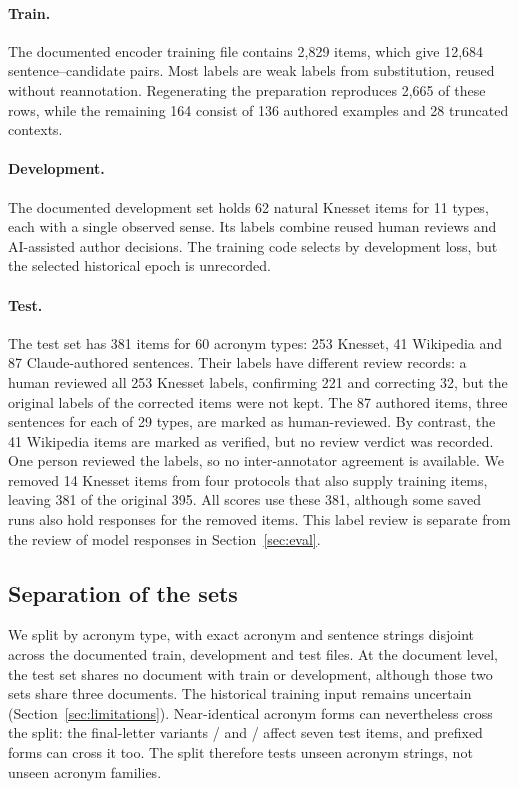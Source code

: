 \paragraph{Train.} The documented encoder training file contains 2,829 items, which give 12,684 sentence--candidate pairs. Most labels are weak labels from substitution, reused without reannotation. Regenerating the preparation reproduces 2,665 of these rows, while the remaining 164 consist of 136 authored examples and 28 truncated contexts.

\paragraph{Development.} The documented development set holds 62 natural Knesset items for 11 types, each with a single observed sense. Its labels combine reused human reviews and AI-assisted author decisions. The training code selects by development loss, but the selected historical epoch is unrecorded.

\paragraph{Test.} The test set has 381 items for 60 acronym types: 253 Knesset, 41 Wikipedia and 87 Claude-authored sentences. Their labels have different review records: a human reviewed all 253 Knesset labels, confirming 221 and correcting 32, but the original labels of the corrected items were not kept. The 87 authored items, three sentences for each of 29 types, are marked as human-reviewed. By contrast, the 41 Wikipedia items are marked as verified, but no review verdict was recorded. One person reviewed the labels, so no inter-annotator agreement is available. We removed 14 Knesset items from four protocols that also supply training items, leaving 381 of the original 395. All scores use these 381, although some saved runs also hold responses for the removed items. This label review is separate from the review of model responses in Section~\ref{sec:eval}.

\subsection{Separation of the sets}
\label{sec:separation}
We split by acronym type, with exact acronym and sentence strings disjoint across the documented train, development and test files. At the document level, the test set shares no document with train or development, although those two sets share three documents. The historical training input remains uncertain (Section~\ref{sec:limitations}). Near-identical acronym forms can nevertheless cross the split: the final-letter variants / and / affect seven test items, and prefixed forms can cross it too. The split therefore tests unseen acronym strings, not unseen acronym families.

